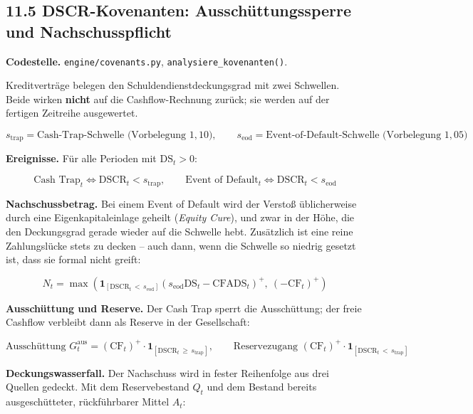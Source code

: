 \documentclass[
  a4paper,
  10pt]{article}
\begin{document}
\hypertarget{dscr-kovenanten-ausschuxfcttungssperre-und-nachschusspflicht}{%
\subsection{11.5 DSCR-Kovenanten: Ausschüttungssperre und
Nachschusspflicht}\label{dscr-kovenanten-ausschuxfcttungssperre-und-nachschusspflicht}}

\textbf{Codestelle.} \nolinkurl{engine/covenants.py},
\texttt{analysiere\_kovenanten()}.

Kreditverträge belegen den Schuldendienstdeckungsgrad mit zwei
Schwellen. Beide wirken \textbf{nicht} auf die Cashflow-Rechnung zurück;
sie werden auf der fertigen Zeitreihe ausgewertet.

\[ s_{\mathrm{trap}} = \text{Cash-Trap-Schwelle (Vorbelegung } 1{,}10\text{)}, \qquad s_{\mathrm{eod}} = \text{Event-of-Default-Schwelle (Vorbelegung } 1{,}05\text{)} \]

\textbf{Ereignisse.} Für alle Perioden mit \(\mathrm{DS}_t > 0\):

\[ \text{Cash Trap}_t \iff \mathrm{DSCR}_t < s_{\mathrm{trap}}, \qquad \text{Event of Default}_t \iff \mathrm{DSCR}_t < s_{\mathrm{eod}} \]

\textbf{Nachschussbetrag.} Bei einem Event of Default wird der Verstoß
üblicherweise durch eine Eigenkapitaleinlage geheilt (\emph{Equity
Cure}), und zwar in der Höhe, die den Deckungsgrad gerade wieder auf die
Schwelle hebt. Zusätzlich ist eine reine Zahlungslücke stets zu decken
-- auch dann, wenn die Schwelle so niedrig gesetzt ist, dass sie formal
nicht greift:

\[ N_t = \max\left( \mathbf{1}_{[\mathrm{DSCR}_t\, <\, s_{\mathrm{eod}}]} \left(s_{\mathrm{eod}} \mathrm{DS}_t - \mathrm{CFADS}_t\right)^{+},\ \left(-\mathrm{CF}_t\right)^{+} \right) \]

\textbf{Ausschüttung und Reserve.} Der Cash Trap sperrt die
Ausschüttung; der freie Cashflow verbleibt dann als Reserve in der
Gesellschaft:

\[ \text{Ausschüttung } G_t^{\mathrm{aus}} = \left(\mathrm{CF}_t\right)^{+} \cdot \mathbf{1}_{[\mathrm{DSCR}_t\, \geq\, s_{\mathrm{trap}}]}, \qquad \text{Reservezugang } \left(\mathrm{CF}_t\right)^{+} \cdot \mathbf{1}_{[\mathrm{DSCR}_t\, <\, s_{\mathrm{trap}}]} \]

\textbf{Deckungswasserfall.} Der Nachschuss wird in fester Reihenfolge
aus drei Quellen gedeckt. Mit dem Reservebestand \(Q_t\) und dem Bestand
bereits ausgeschütteter, rückführbarer Mittel \(A_t\):
\end{document}
